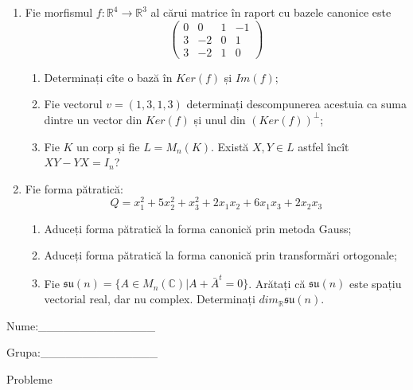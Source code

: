 \documentclass{article}
\begin{document}
\begin{enumerate}
 \item Fie morfismul $f:\mathbb{R}^4 \to \mathbb{R}^3$ al cărui matrice în raport cu bazele canonice este
$$\begin{pmatrix}
0&0&1&-1\\
3&-2&0&1\\
3&-2&1&0
\end{pmatrix}$$

\begin{enumerate}
\item Determinați cîte o bază în $Ker(f)$ și $Im(f)$;
\item Fie vectorul $v=(1,3,1,3)$ determinați descompunerea acestuia ca suma dintre un vector din $Ker(f)$ și unul din $(Ker(f))^\perp$;
\item Fie $K$ un corp și fie $L=M_n(K)$. Există $X,Y \in L$ astfel încît $XY-YX=I_n$?  
\end{enumerate}
\item Fie forma pătratică:
$$Q= x_1^2+5x_2^2+x_3^2+2x_1x_2+6x_1x_3+2x_2x_3$$

\begin{enumerate}
\item Aduceți forma pătratică la forma canonică prin metoda Gauss;
\item Aduceți forma pătratică la forma canonică prin transformări ortogonale;
\item Fie $\mathfrak{su}(n)=\{ A \in M_n(\mathbb{C}) | A+\bar{A}^t=0\}$. Arătați că $\mathfrak{su}(n)$ este spațiu vectorial real, dar nu complex.
Determinați $dim_{\mathbb{R}}\mathfrak{su}(n)$.
\end{enumerate}
\end{enumerate}
\newpage
\begin{flushright}
Nume:\_\_\_\_\_\_\_\_\_\_\_\_\_\_
 
 
Grupa:\_\_\_\_\_\_\_\_\_\_\_\_\_\_
\end{flushright}
\begin{center}
\vspace{2cm}
{\Large Probleme}
\vspace{2cm}
\end{center}
\end{document}
